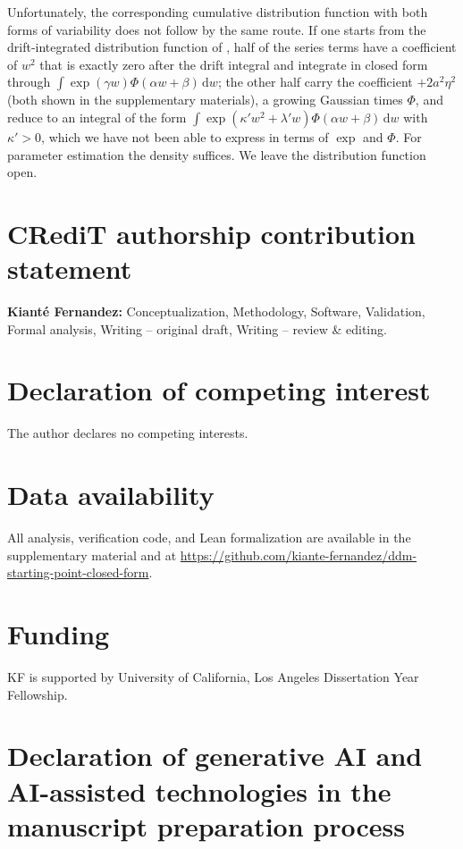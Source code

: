 \documentclass[final,5p,times,twocolumn,authoryear]{elsarticle}
\newcommand{\dd}{\,\mathrm{d}}
\begin{document}
Unfortunately, the corresponding cumulative distribution function with both forms of variability does not follow by the same route. If one starts from the drift-integrated distribution function of \citet{Blurton2017}, half of the series terms have a coefficient of $w^2$ that is exactly zero after the drift integral and integrate in closed form through $\int\exp(\gamma w)\Phi(\alpha w + \beta)\dd w$; the other half carry the coefficient $+2a^2\eta^2$ (both shown in the supplementary materials), a growing Gaussian times $\Phi$, and reduce to an integral of the form $\int\exp(\kappa' w^2 + \lambda' w)\Phi(\alpha w + \beta)\dd w$ with $\kappa' > 0$, which we have not been able to express in terms of $\exp$ and $\Phi$. For parameter estimation the density suffices. We leave the distribution function open.

\section*{CRediT authorship contribution statement}

\textbf{Kiant\'e Fernandez:} Conceptualization, Methodology, Software, Validation, Formal analysis, Writing -- original draft, Writing -- review \& editing.

\section*{Declaration of competing interest}

The author declares no competing interests.

\section*{Data availability}

All analysis, verification code, and Lean formalization are available in the supplementary material and at \url{https://github.com/kiante-fernandez/ddm-starting-point-closed-form}.

\section*{Funding}

KF is supported by University of California, Los Angeles Dissertation Year Fellowship.

\section*{Declaration of generative AI and AI-assisted technologies in the manuscript preparation process}
\end{document}
